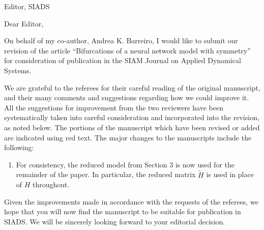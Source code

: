 \documentclass[11pt]{letter}
\begin{document}
\address{Ross Parker \\
Department of Mathematics \\
Southern Methodist University \\
Dallas, TX 75275 \\
\texttt{rhparker@smu.edu}}%
\signature{Ross Parker}
\begin{letter}{Editor, SIADS}

\opening{Dear Editor,}

On behalf of my co-author, Andrea K. Barreiro, I would like to submit our revision of the article ``Bifurcations of a neural network model with symmetry'' for consideration of publication in the SIAM Journal on Applied Dynamical Systems. 

We are grateful to the referees for their careful reading of the original manuscript, and their many comments and suggestions regarding how we could improve it. All the suggestions for improvement from the two reviewers have been systematically taken into careful consideration and incorporated into the revision, as noted below. The portions of the manuscript which have been revised or added are indicated using red text. The major changes to the manuscripts include the following:
\begin{enumerate}
    \item For consistency, the reduced model from Section 3 is now used for the remainder of the paper. In particular, the reduced matrix $\tilde{H}$ is used in place of $H$ throughout.
\end{enumerate}

Given the improvements made in accordance with the requests of the referees, we hope that you will now find the manuscript to be suitable for publication in SIADS. We will be sincerely looking forward to your editorial decision.


\end{letter}
\end{document}
